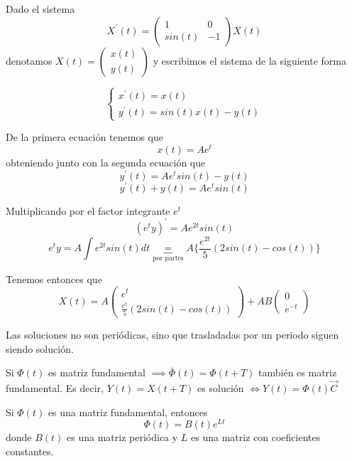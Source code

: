 \documentclass{mathnotes}
\begin{document}
\begin{example}
Dado el sistema
$$X^\prime(t) = \begin{pmatrix}
1 & 0 \\ sin(t) & -1
\end{pmatrix}X(t)$$ denotamos $X(t) = \begin{pmatrix}
x(t)\\y(t)
\end{pmatrix}$ y escribimos el sistema de la siguiente forma

\begin{equation*}
  \left\lbrace
  \begin{array}{l}
     x^\prime(t) = x(t)\\
     y^\prime(t) = sin(t)x(t)-y(t)
  \end{array}
  \right.
\end{equation*}

De la primera ecuación tenemos que $$x(t) = Ae^t$$
obteniendo junto con la segunda ecuación que $$y^\prime(t) = Ae^tsin(t) -y(t)$$
$$y^\prime(t) +y(t) = Ae^tsin(t)$$

Multiplicando por el factor integrante $e^t$
$$(e^ty)^\prime = Ae^{2t}sin(t)$$
$$e^ty = A\int e^{2t}sin(t)dt \underbrace{=}_{\text{por partes}} A\{ \frac{e^{2t}}{5}(2sin(t)-cos(t)) \}$$

Tenemos entonces que 
$$X(t) = A\begin{pmatrix}
e^t\\\frac{e^t}{5}(2sin(t)-cos(t))
\end{pmatrix} + AB\begin{pmatrix}
0\\e^{-t}
\end{pmatrix}$$

Las soluciones no son periódicas, sino que trasladadas por un periodo siguen siendo solución.
\end{example}

\obs 
Si $\Phi(t)$ es matriz fundamental $\implies \bar{\Phi}(t) = \Phi(t+T)$ también es matriz fundamental. Es decir, $Y(t) = X(t+T)$ es solución $\iff Y(t) = \Phi(t)\vec{C}$

\begin{theorem}
Si $\Phi(t)$ es una matriz fundamental, entonces $$\Phi(t) = B(t) e^{Lt}$$ donde $B(t)$ es una matriz periódica y $L$ es una matriz con coeficientes constantes. 
\end{theorem}
\end{document}
